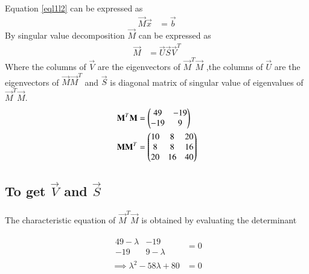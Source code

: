 \documentclass[journal,12pt,twocolumn]{IEEEtran}
\begin{document}
Equation \eqref{eql1l2} can be expressed as 
\begin{align}
    \vec{M}\vec{x}&=\vec{b}\label{mx=b}
\end{align}
By singular value decomposition $\vec{M}$
can be expressed as 
\begin{align}
    \vec{M}&=\vec{U}\vec{S}\vec{V}^T\label{main}
\end{align}
Where the columns of $\vec{V}$ are the eigenvectors of $\vec{M}^T\vec{M}$ ,the columns of $\vec{U}$ are the eigenvectors of $\vec{M}\vec{M}^T$ and $\vec{S}$ is diagonal matrix of singular value of eigenvalues of $\vec{M}^T\vec{M}$.
\begin{align}
\mathbf{M}^T\mathbf{M}&=\begin{pmatrix}49&-19\\-19&9\end{pmatrix}\label{2.0.6}\\
\mathbf{M}\mathbf{M}^T&=\begin{pmatrix}10&8&20\\8&8&16\\20&16&40\end{pmatrix}
\end{align}

\subsection{To get $\vec{V}$ and $\vec{S}$ }
The characteristic equation of $\vec{M}^T\vec{M}$ is obtained by evaluating the determinant 

\begin{align}
   \begin{array}{|cc|}
49-\lambda & -19 \\ -19 & 9-\lambda
\end{array}&=0\\
\implies \lambda^2-58\lambda+80&=0\label{eqroots}
\end{align}
\end{document}
